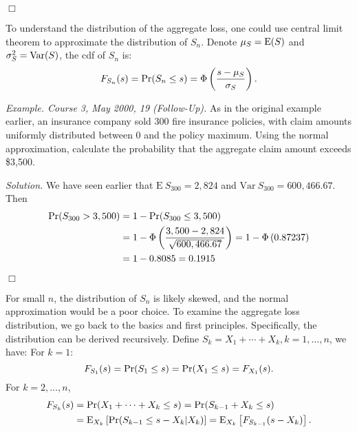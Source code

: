 \documentclass[12pt,letterpaper]{article}
\begin{document}
\begin{flushright}$\Box$\end{flushright}

To understand the distribution of the aggregate loss, one could use central limit theorem to approximate the distribution of $S_n$. Denote $\mu_S={\rm E}(S)$ and $\sigma^2_S={\rm Var}(S)$, the cdf of $S_n$ is:
\begin{align*}
 F_{S_n}(s)={\rm Pr}({S_n}\leq s) = \Phi \left(\frac{s-\mu_S}{\sigma_S}\right).
\end{align*}


\noindent \textit{Example. Course 3, May 2000, 19 (Follow-Up).} As in the original example earlier, an insurance company sold 300 fire insurance policies, with claim amounts uniformly distributed between 0 and the policy maximum. Using the normal approximation, calculate the probability that the aggregate claim amount exceeds \$3,500.

\bigskip

\noindent \textit{Solution.}
We have seen earlier that $\mathrm{E~} S_{300}=2,824$ and $\mathrm{Var~}S_{300} = 600,466.67$. Then
\begin{align*}
{\rm Pr}(S_{300} > 3,500) &= 1 - {\rm Pr}(S_{300} \leq 3,500) \\
&= 1- \Phi \left( \frac{3,500-2,824}{\sqrt{600,466.67}} \right) = 1 - \Phi \left( 0.87237 \right) \\
&= 1 - 0.8085 = 0.1915
\end{align*}
\begin{flushright}$\Box$\end{flushright}

For small $n$, the distribution of $S_n$ is likely skewed, and the normal approximation would be a poor choice. To examine the aggregate loss distribution, we go back to the basics and first principles. Specifically, the distribution can be derived recursively. Define $S_k=X_1 + \cdots + X_k, k=1,\ldots,n$, we have:
For $k=1$:
$$F_{S_1}(s) = {\rm Pr}(S_1\leq s) = {\rm Pr}(X_1\leq s) = F_{X_1}(s).$$
For $k=2,\ldots,n$,
   \begin{align*}
    F_{S_k}(s)&={\Pr}(X_1+\cdots+X_k\leq s) ={\Pr}(S_{k-1}+X_k\leq s) \\
    &={\rm E}_{X_k}\left[{\rm Pr}(S_{k-1}\leq s-X_k|X_k)\right]= {\rm E}_{X_k}\left[F_{S_{k-1}}(s-X_k)\right].
   \end{align*}
\end{document}
